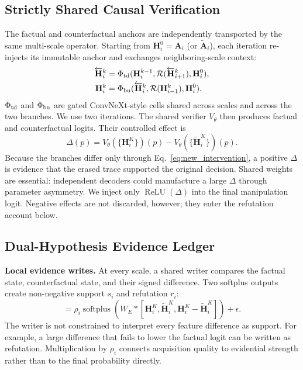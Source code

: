 \subsection{Strictly Shared Causal Verification}
\label{sec:verifier}

The factual and counterfactual anchors are independently transported by the same
multi-scale operator. Starting from $\mathbf H_i^0=\mathbf A_i$ (or
$\widetilde{\mathbf A}_i$), each iteration re-injects its immutable anchor and
exchanges neighboring-scale context:
\begin{equation}
\begin{split}
\overleftarrow{\mathbf H}_i^k&=\Phi_{\rm td}(\mathbf H_i^{k-1},
\mathcal R(\overleftarrow{\mathbf H}_{i+1}^k),\mathbf H_i^0),\\
\mathbf H_i^k&=\Phi_{\rm bu}(\overleftarrow{\mathbf H}_i^k,
\mathcal R(\mathbf H_{i-1}^k),\mathbf H_i^0).
\end{split}
\label{eq:new_transport}
\end{equation}
$\Phi_{\rm td}$ and $\Phi_{\rm bu}$ are gated ConvNeXt-style cells shared across
scales and across the two branches. We use two iterations. The shared verifier
$V_\theta$ then produces factual and counterfactual logits. Their controlled
effect is
\begin{equation}
\Delta(p)=V_\theta(\{\mathbf H_i^K\})(p)-
V_\theta(\{\widetilde{\mathbf H}_i^K\})(p).
\label{eq:new_effect}
\end{equation}
Because the branches differ only through Eq.~\eqref{eq:new_intervention}, a
positive $\Delta$ is evidence that the erased trace supported the original
decision. Shared weights are essential: independent decoders could manufacture a
large $\Delta$ through parameter asymmetry. We inject only
$\operatorname{ReLU}(\Delta)$ into the final manipulation logit. Negative effects
are not discarded, however; they enter the refutation account below.

\subsection{Dual-Hypothesis Evidence Ledger}
\label{sec:dhel}

\textbf{Local evidence writes.}
At every scale, a shared writer compares the factual state, counterfactual state,
and their signed difference. Two softplus outputs create non-negative support
$s_i$ and refutation $r_i$:
\begin{equation}
[s_i,r_i]=\rho_i\operatorname{softplus}\!\left(
W_E*[\mathbf H_i^K,\widetilde{\mathbf H}_i^K,
\mathbf H_i^K-\widetilde{\mathbf H}_i^K]\right)+\epsilon.
\label{eq:new_write}
\end{equation}
The writer is not constrained to interpret every feature difference as support.
For example, a large difference that fails to lower the factual logit can be
written as refutation. Multiplication by $\rho_i$ connects acquisition quality to
evidential strength rather than to the final probability directly.

